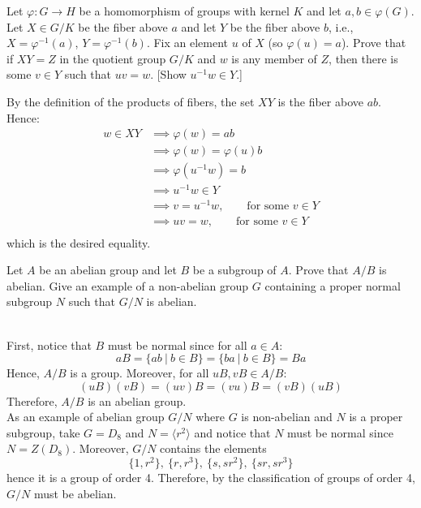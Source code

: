 \begin{exercise}
    Let $\varphi : G \to H$ be a homomorphism of groups with kernel $K$ and let $a,b \in \varphi(G)$. Let $X \in G/K$ be the fiber above $a$ and let $Y$ be the fiber above $b$, i.e., $X = \varphi^{-1}(a)$, $Y = \varphi^{-1}(b)$. Fix an element $u$ of $X$ (so $\varphi(u) = a$). Prove that if $XY = Z$ in the quotient group $G/K$ and $w$ is any member of $Z$, then there is some $v \in Y$ such that $uv = w$. [Show $u^{-1}w \in Y$.] \\
\end{exercise}

\begin{solution}
    By the definition of the products of fibers, the set $XY$ is the fiber above $ab$. Hence:
    \begin{align*}
        w \in XY &\implies \varphi(w) = ab \\
        &\implies \varphi(w) = \varphi(u)b \\
        &\implies \varphi(u^{-1}w) = b \\
        &\implies u^{-1}w \in Y \\
        &\implies v = u^{-1}w, \qquad \text{for some }v\in Y\\
        &\implies uv = w, \qquad \text{for some }v\in Y\\
    \end{align*}
    which is the desired equality. \\
\end{solution}

\begin{exercise}
    Let $A$ be an abelian group and let $B$ be a subgroup of $A$. Prove that $A/B$ is abelian. Give an example of a non-abelian group $G$ containing a proper normal subgroup $N$ such that $G/N$ is abelian. \\
\end{exercise}

\begin{solution}
    \\ First, notice that $B$ must be normal since for all $a \in A$:
    $$a B = \{ab \ | \ b \in B\} = \{ba \ | \ b \in B\} = Ba$$
    Hence, $A/B$ is a group. Moreover, for all $uB, vB \in A/B$:
    $$(uB)(vB) = (uv)B = (vu)B = (vB)(uB)$$
    Therefore, $A/B$ is an abelian group. \\
    As an example of abelian group $G/N$ where $G$ is non-abelian and $N$ is a proper subgroup, take $G = D_8$ and $N = \langle r^2 \rangle$ and notice that $N$ must be normal since $N = Z(D_8)$. Moreover, $G/N$ contains the elements 
    $$\{1, r^2\}, \ \{r, r^3\}, \ \{s, sr^2\}, \ \{sr, sr^3\}$$
    hence it is a group of order 4. Therefore, by the classification of groups of order 4, $G/N$ must be abelian. \\ 
\end{solution}

